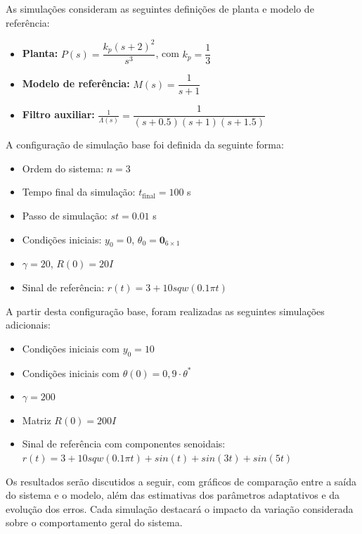 \documentclass[10pt]{article}
\begin{document}
As simulações consideram as seguintes definições de planta e modelo de referência:

\begin{itemize}
    \item \textbf{Planta:} \( P(s) = \dfrac{k_p(s + 2)^2}{s^3} \), com \( k_p = \dfrac{1}{3} \)
    \item \textbf{Modelo de referência:} \( M(s) = \dfrac{1}{s + 1} \)
    \item \textbf{Filtro auxiliar:} \( \frac{1}{\Lambda(s)} = \dfrac{1}{(s + 0.5)(s + 1)(s + 1.5)} \)
\end{itemize}

A configuração de simulação base foi definida da seguinte forma:

\begin{itemize}
    \item Ordem do sistema: $n = 3$
    \item Tempo final da simulação: $t_{\text{final}} = 100$ s
    \item Passo de simulação: $st = 0.01$ s
    \item Condições iniciais: $y_0 = 0$, $\theta_0 = \mathbf{0}_{6\times1}$
    \item $\gamma = 20$, $R(0) = 20I$
    \item Sinal de referência: $r(t) =  3 + 10sqw(0.1 \pi t)$
\end{itemize}

A partir desta configuração base, foram realizadas as seguintes simulações adicionais:

\begin{itemize}
    \item Condições iniciais com $y_0 = 10$
    \item Condições iniciais com $\theta(0) = 0{,}9 \cdot \theta^*$
    \item $\gamma = 200$
    \item Matriz $R(0) = 200I$
    \item Sinal de referência com componentes senoidais: $r(t) =  3 + 10sqw(0.1 \pi t) + sin(t) + sin(3t) + sin(5t)$
\end{itemize}

Os resultados serão discutidos a seguir, com gráficos de comparação entre a saída do sistema e o modelo, além das estimativas dos parâmetros adaptativos e da evolução dos erros. Cada simulação destacará o impacto da variação considerada sobre o comportamento geral do sistema.

\newpage
\end{document}

